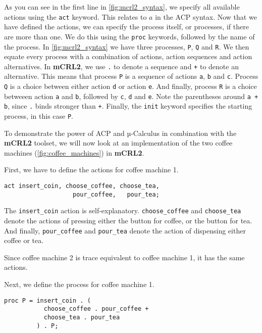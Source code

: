 \documentclass{clseminar}
\begin{document}
  As you can see in the first line in \autoref{fig:mcrl2_syntax}, we specify all available actions using the \texttt{act} keyword. This relates to $a$ in the ACP syntax. Now that we have defined the actions, we can specify the process itself, or processes, if there are more than one. We do this using the \texttt{proc} keywords, followed by the name of the process. In \autoref{fig:mcrl2_syntax} we have three processes, \texttt{P}, \texttt{Q} and \texttt{R}. We then equate every process with a combination of actions, action sequences and action alternatives. In \textbf{mCRL2}, we use \texttt{.} to denote a sequence and \texttt{+} to denote an alternative. This means that process \texttt{P} is a sequence of actions \texttt{a}, \texttt{b} and \texttt{c}. Process \texttt{Q} is a choice between either action \texttt{d} or action \texttt{e}. And finally, process \texttt{R} is a choice betweeen action \texttt{a} and \texttt{b}, followed by \texttt{c}, \texttt{d} and \texttt{e}. Note the parentheses around \texttt{a + b}, since \texttt{.} binds stronger than \texttt{+}. Finally, the \texttt{init} keyword specifies the starting process, in this case \texttt{P}.

  To demonstrate the power of ACP and µ-Calculus in combination with the \textbf{mCRL2} toolset, we will now look at an implementation of the two coffee machines (\autoref{fig:coffee_machines}) in \textbf{mCRL2}.

  First, we have to define the actions for coffee machine 1.

  \begin{lstlisting}[language=mCRL2]
act insert_coin, choose_coffee, choose_tea,
                   pour_coffee,   pour_tea;
  \end{lstlisting}

  The \texttt{insert\_coin} action is self-explanatory. \texttt{choose\_coffee} and \texttt{choose\_tea} denote the actions of pressing either the button for coffee, or the button for tea. And finally, \texttt{pour\_coffee} and \texttt{pour\_tea} denote the action of dispensing either coffee or tea.

  Since coffee machine 2 is trace equivalent to coffee machine 1, it has the same actions.

  Next, we define the process for coffee machine 1.

  \begin{lstlisting}[language=mCRL2]
proc P = insert_coin . (
           choose_coffee . pour_coffee +
           choose_tea . pour_tea
         ) . P;
  \end{lstlisting}
\end{document}
